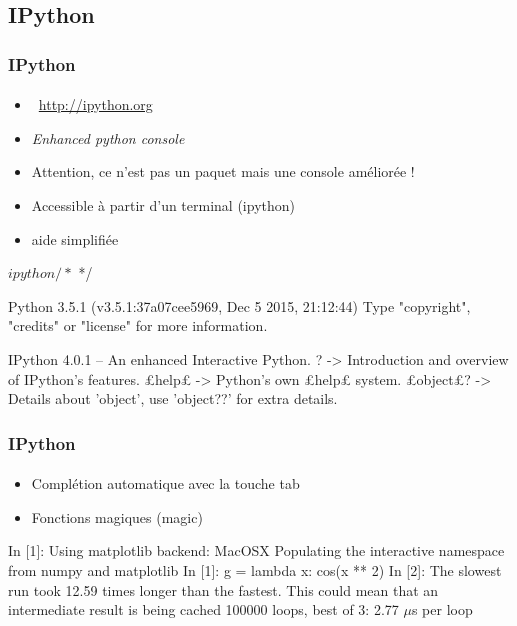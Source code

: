 \subsection{IPython}
\begin{frame}[fragile]
\frametitle{IPython}
\framesubtitle{}
\begin{itemize}
 \item {} \, \url{http://ipython.org}
 \item \emph{Enhanced python console}
 \item Attention, ce n'est pas un paquet mais une console améliorée !
 \item Accessible à partir d'un terminal (ipython) 
 \item aide simplifiée
\end{itemize}

\begin{shell}
$ ipython /* $ */
\end{shell} 

\begin{pythonConsole}
Python 3.5.1 (v3.5.1:37a07cee5969, Dec  5 2015, 21:12:44) 
Type "copyright", "credits" or "license" for more information.

IPython 4.0.1 -- An enhanced Interactive Python.
?         -> Introduction and overview of IPython's features.
£help£      -> Python's own £help£ system.
£object£?   -> Details about 'object', use 'object??' for extra details.
\end{pythonConsole}
\end{frame}
\begin{frame}[fragile]
\frametitle{IPython}
\framesubtitle{}
\begin{itemize}
 \item Complétion automatique avec la touche tab
 \item Fonctions magiques (magic)
\end{itemize}

\begin{pythonConsole}
In [1]: %
Using matplotlib backend: MacOSX
Populating the interactive namespace from numpy and matplotlib
In [1]: g = lambda x: cos(x ** 2)
In [2]: %
The slowest run took 12.59 times longer than the fastest. 
This could mean that an intermediate result is being cached 
100000 loops, best of 3: 2.77 $\mu$s per loop
\end{pythonConsole}
\end{frame}
